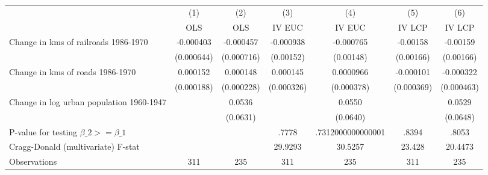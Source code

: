 {
\def\sym#1{\ifmmode^{#1}\else\(^{#1}\)\fi}
\begin{tabular}{l*{6}{c}}
\hline\hline
                &\multicolumn{1}{c}{(1)}&\multicolumn{1}{c}{(2)}&\multicolumn{1}{c}{(3)}&\multicolumn{1}{c}{(4)}&\multicolumn{1}{c}{(5)}&\multicolumn{1}{c}{(6)}\\
                &\multicolumn{1}{c}{OLS}&\multicolumn{1}{c}{OLS}&\multicolumn{1}{c}{IV EUC}&\multicolumn{1}{c}{IV EUC}&\multicolumn{1}{c}{IV LCP}&\multicolumn{1}{c}{IV LCP}\\
\hline
Change in kms of railroads 1986-1970&-0.000403         &-0.000457         &-0.000938         &-0.000765         & -0.00158         & -0.00159         \\
                &(0.000644)         &(0.000716)         &(0.00152)         &(0.00148)         &(0.00166)         &(0.00166)         \\
[1em]
Change in kms of roads 1986-1970& 0.000152         & 0.000148         & 0.000145         &0.0000966         &-0.000101         &-0.000322         \\
                &(0.000188)         &(0.000228)         &(0.000326)         &(0.000378)         &(0.000369)         &(0.000463)         \\
[1em]
Change in log urban population 1960-1947&                  &   0.0536         &                  &   0.0550         &                  &   0.0529         \\
                &                  & (0.0631)         &                  & (0.0640)         &                  & (0.0648)         \\
\hline
P-value for testing $\beta\_{2} >= \beta\_{1}$&                  &                  &    .7778         &.7312000000000001         &    .8394         &    .8053         \\
Cragg-Donald (multivariate) F-stat&                  &                  &  29.9293         &  30.5257         &   23.428         &  20.4473         \\
Observations    &      311         &      235         &      311         &      235         &      311         &      235         \\
\hline\hline
\end{tabular}
}
